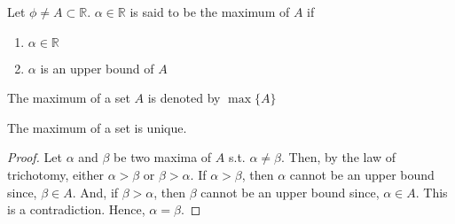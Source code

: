 \documentclass{scrartcl}
\newcommand{\rn}{\mathbb{R}}
\begin{document}
    \begin{definition}[Maximum]
        Let $\phi \neq A \subset \rn$. $\alpha \in \rn$ is said to be the maximum of $A$ if 
        \begin{enumerate}[label={(\roman*)}]
            \item $\alpha \in \rn$
            \item $\alpha$ is an upper bound of $A$ 
        \end{enumerate}
        The maximum of a set $A$ is denoted by $\max\{A\}$
    \end{definition}
    \begin{theorem}
        The maximum of a set is unique.
        \begin{proof}
            Let $\alpha$ and $\beta$ be two maxima of $A$ s.t. $\alpha \neq \beta$. Then, by the law of trichotomy,
            either $\alpha > \beta$ or $\beta > \alpha$. 
            If $\alpha > \beta$, then $\alpha$ cannot be an upper bound since, $\beta \in A$. And,
            if $\beta > \alpha$, then $\beta$ cannot be an upper bound since, $\alpha \in A$. This is a contradiction. 
            Hence, $\alpha = \beta$.
        \end{proof}
    \end{theorem}
\end{document}
